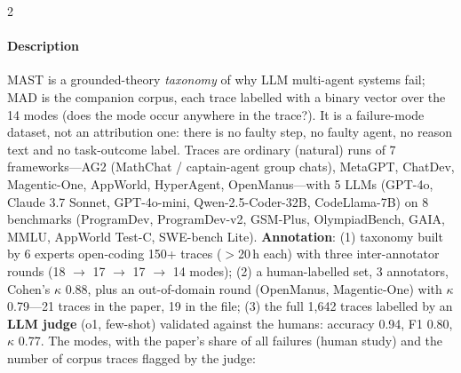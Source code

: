 \begin{multicols}{2}
\paragraph{Description} MAST is a grounded-theory \emph{taxonomy} of why LLM multi-agent systems fail; MAD is the companion corpus, each trace labelled with a binary vector over the 14 modes (does the mode occur anywhere in the trace?). It is a failure-mode dataset, not an attribution one: there is no faulty step, no faulty agent, no reason text and no task-outcome label. Traces are ordinary (natural) runs of 7 frameworks---AG2 (MathChat / captain-agent group chats), MetaGPT, ChatDev, Magentic-One, AppWorld, HyperAgent, OpenManus---with 5 LLMs (GPT-4o, Claude 3.7 Sonnet, GPT-4o-mini, Qwen-2.5-Coder-32B, CodeLlama-7B) on 8 benchmarks (ProgramDev, ProgramDev-v2, GSM-Plus, OlympiadBench, GAIA, MMLU, AppWorld Test-C, SWE-bench Lite). \textbf{Annotation}: (1) taxonomy built by 6 experts open-coding 150+ traces ($>$20\,h each) with three inter-annotator rounds (18 $\to$ 17 $\to$ 17 $\to$ 14 modes); (2) a human-labelled set, 3 annotators, Cohen's $\kappa$ 0.88, plus an out-of-domain round (OpenManus, Magentic-One) with $\kappa$ 0.79---21 traces in the paper, 19 in the file; (3) the full 1,642 traces labelled by an \textbf{LLM judge} (o1, few-shot) validated against the humans: accuracy 0.94, F1 0.80, $\kappa$ 0.77. The modes, with the paper's share of all failures (human study) and the number of corpus traces flagged by the judge:


\end{multicols}
